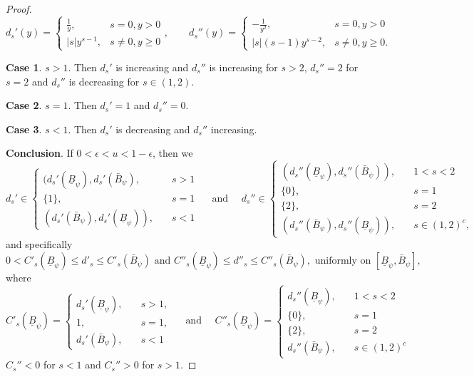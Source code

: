 \documentclass[10pt,a4paper]{amsart}
\begin{document}
\begin{proof}
$$
d_s'(y)= \begin{cases}\frac{1}{y}, & s=0, y>0 \\ |s|y^{s-1}, & s\neq0, y\geq 0\end{cases}, \qquad d_s''(y)= \begin{cases}-\frac{1}{y^2}, & s=0, y>0 \\ |s|(s-1)y^{s-2}, & s\neq0, y\geq 0.\end{cases}
$$

\textbf{Case 1}. $s>1$. Then $d_s'$ is increasing and $d_s''$ is increasing for $s>2$,  $d_s''=2$ for $s=2$ and $d_s''$ is decreasing for $s\in (1,2)$.

\textbf{Case 2}. $s=1$. Then $d_s'=1$ and $d_s''=0$.

\textbf{Case 3}. $s < 1$. Then $d_s'$ is decreasing and $d_s''$ increasing. 

\textbf{Conclusion}. If $0<\epsilon < u < 1-\epsilon$, then we
$$
d_{s}'\in
\begin{cases}
    (d_{s}'(\underline{B}_{\psi}),d_{s}'(\bar{B}_{\psi}),\quad & s > 1\\
    \{1\},\quad & s = 1\\
    (d_{s}'(\bar{B}_{\psi}),d_{s}'(\underline{B}_{\psi})),\quad & s < 1
\end{cases}
\quad \text{ and } \quad
d_{s}''\in
\begin{cases}
    (d_{s}''(\underline{B}_{\psi}),d_{s}''(\bar{B}_{\psi})),\quad & 1< s < 2\\
    \{0\},\quad & s = 1\\
    \{2\},\quad & s = 2\\
    (d_{s}''(\bar{B}_{\psi}),d_{s}''(\underline{B}_{\psi})),\quad & s \in (1,2)^c,
\end{cases}
$$
and specifically
$$
0< C'_{s}(\underline{B}_{\psi}) \leq d'_{s} \leq C'_{s}(\bar{B}_{\psi}) \text{ and } C''_{s}(\underline{B}_{\psi}) \leq d''_{s} \leq C''_{s}(\bar{B}_{\psi}), \text{ uniformly on }[\underline{B}_{\psi}, \bar{B}_{\psi}],
$$
where 
$$
C'_{s}(\underline{B}_{\psi})=
\begin{cases}
    d_{s}'(\underline{B}_{\psi}), \quad &s >1,\\
    1, \quad &s =1,\\
    d_{s}'(\bar{B}_{\psi}), \quad &s <1
\end{cases}
\quad \text{ and } \quad 
C''_{s}(\underline{B}_{\psi}) = 
\begin{cases}
    d_{s}''(\underline{B}_{\psi}),\quad & 1< s < 2\\
    \{0\},\quad & s = 1\\
    \{2\},\quad & s = 2\\
    d_{s}''(\bar{B}_{\psi}),\quad & s \in (1,2)^c
\end{cases}
$$
$C_s''< 0$ for $s<1$ and $C_s''>0$ for $s> 1$.
\end{proof}
\end{document}
